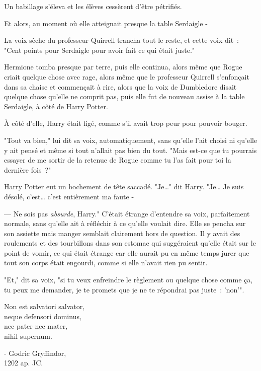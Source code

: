 Un babillage s'éleva et les élèves cessèrent d'être pétrifiés.

Et alors, au moment où elle atteignait presque la table Serdaigle -

La voix sèche du professeur Quirrell trancha tout le reste, et cette voix dit~: "Cent points pour Serdaigle pour avoir fait ce qui était juste."

Hermione tomba presque par terre, puis elle continua, alors même que Rogue criait quelque chose avec rage, alors même que le professeur Quirrell s'enfonçait dans sa chaise et commençait à rire, alors que la voix de Dumbledore disait quelque chose qu'elle ne comprit pas, puis elle fut de nouveau assise à la table Serdaigle, à côté de Harry Potter.

À côté d'elle, Harry était figé, comme s'il avait trop peur pour pouvoir bouger.

"Tout va bien," lui dit sa voix, automatiquement, sans qu'elle l'ait choisi ni qu'elle y ait pensé et même si tout n'allait pas bien du tout. "Mais est-ce que tu pourrais essayer de me sortir de la retenue de Rogue comme tu l'as fait pour toi la dernière fois~?"

Harry Potter eut un hochement de tête saccadé. "Je…" dit Harry. "Je… Je suis désolé, c'est… c'est entièrement ma faute -

--- Ne sois pas \emph{absurde}, Harry." C'était étrange d'entendre sa voix, parfaitement normale, sans qu'elle ait à réfléchir à ce qu'elle voulait dire. Elle se pencha sur son assiette mais manger semblait clairement hors de question. Il y avait des roulements et des tourbillons dans son estomac qui suggéraient qu'elle était sur le point de vomir, ce qui était étrange car elle aurait pu en même temps jurer que tout son corps était engourdi, comme si elle n'avait rien pu sentir.

"Et," dit sa voix, "si tu veux enfreindre le règlement ou quelque chose comme ça, tu peux me demander, je te promets que je ne te répondrai pas juste~: 'non'".
\later

\begin{center}
Non est salvatori salvator,\\
neque defensori dominus,\\
nec pater nec mater,\\
nihil supernum.

- Godric Gryffindor,\\
1202 ap. JC. 
\end{center}

